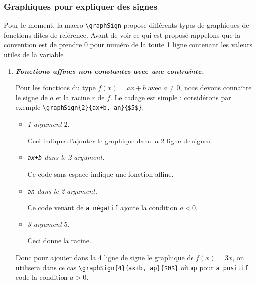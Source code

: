 \documentclass[12pt,a4paper]{book}
\newcommand\env[1]{\texttt{#1}}
\newcommand\macro[1]{\env{\textbackslash{}#1}}
\theoremstyle{definition}
\newcommand\prefix[1]{%
	\texttt{#1}%
}
\begin{document}
{{%


\subsubsection{Graphiques pour expliquer des signes}

Pour le moment, la macro \macro{graphSign} propose différents types de graphiques de fonctions dites de référence.
Avant de voir ce qui est proposé rappelons que la convention est de prendre $0$ pour numéro de la toute 1\iere{} ligne contenant les valeurs utiles de la variable.

\begin{enumerate}
    \item \textbf{\itshape Fonctions affines non constantes avec une contrainte.}
          
          \smallskip

          Pour les fonctions du type $f(x) = a x + b$ avec $a \neq 0$, nous devons connaître le signe de $a$ et la racine $r$ de $f$.
          Le codage est simple : considérons par exemple \verb#\graphSign{2}{ax+b, an}{$5$}#.
          \begin{itemize}[label=\small\textbullet, itemsep=.25em]
          		\item \textit{1\ier{} argument $2$.}

		              \smallskip
		              Ceci indique d'ajouter le graphique dans la 2\ieme{} ligne de signes.


          		\item \textit{\texttt{ax+b} dans le 2\ieme{} argument.}

		              \smallskip
		              Ce code sans espace indique une fonction affine.
		              

          		\item \textit{\texttt{an} dans le 2\ieme{} argument.}

		              \smallskip
		              Ce code venant de \prefix{a négatif} ajoute la condition $a < 0$.

		
				\item \textit{3\ieme{} argument $5$.}

		              \smallskip
		              Ceci donne la racine.
          \end{itemize}

          Donc pour ajouter dans la 4\ieme{} ligne de signe le graphique de $f(x) = 3x$, on utilisera dans ce cas \verb#\graphSign{4}{ax+b, ap}{$0$}# où \prefix{ap} pour \prefix{a positif} code la condition $a > 0$.



\end{enumerate}}}
\end{document}
